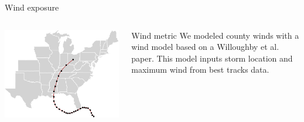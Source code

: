 \documentclass[ignorenonframetext,]{beamer}
\begin{document}
\begin{frame}{Wind exposure}

\begin{columns}
\begin{column}{0.7\textwidth}

\includegraphics[width=\textwidth]{Sept_5_2018_GuestLecture_files/figure-beamer/unnamed-chunk-12-1} 
\end{column}
\begin{column}{0.3\textwidth}
\small
\begin{block}{Wind metric}
We modeled county winds with a wind model based on a Willoughby et al. paper. This model inputs storm location and maximum wind from best tracks data. 
\end{block}
\end{column}
\end{columns}

\end{frame}
\end{document}
